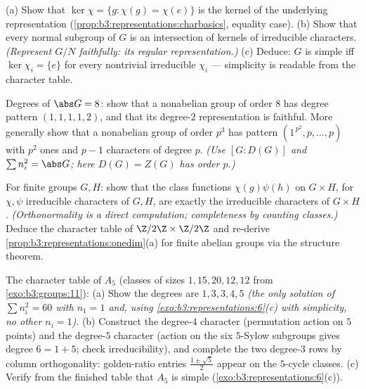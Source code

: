 \begin{exercise}[$\star\star$]\label{exo:b3:representations:6}
(a) Show that $\ker\chi = \{g : \chi(g) = \chi(e)\}$ is the
kernel of the underlying representation
(\cref{prop:b3:representations:charbasics}, equality case).
(b) Show that every normal subgroup of $G$ is an intersection of
kernels of irreducible characters. \emph{(Represent $G/N$
faithfully: its regular representation.)}
(c) Deduce: $G$ is simple iff $\ker\chi_i = \{e\}$ for every
nontrivial irreducible $\chi_i$ --- simplicity is readable from
the character table.
\end{exercise}

\begin{exercise}[$\star\star$]\label{exo:b3:representations:7}
Degrees of $\abs G = 8$: show that a nonabelian group of order
$8$ has degree pattern $(1,1,1,1,2)$, and that its degree-$2$
representation is faithful. More generally show that a
nonabelian group of order $p^3$ has pattern $(1^{\,p^2},
p, \dots, p)$ with $p^2$ ones and $p - 1$ characters of degree
$p$. \emph{(Use $[G : D(G)]$ and $\sum n_i^2 = \abs G$; here
$D(G) = Z(G)$ has order $p$.)}
\end{exercise}

\begin{exercise}[$\star\star\star$]\label{exo:b3:representations:8}
For finite groups $G, H$: show that the class functions
$\chi(g)\psi(h)$ on $G \times H$, for $\chi, \psi$ irreducible
characters of $G, H$, are exactly the irreducible characters of
$G \times H$. \emph{(Orthonormality is a direct computation;
completeness by counting classes.)} Deduce the character table
of $\Z/2\Z \times \Z/2\Z$ and re-derive
\cref{prop:b3:representations:onedim}(a) for finite abelian
groups via the structure theorem.
\end{exercise}

\begin{exercise}[$\star\star\star$]\label{exo:b3:representations:9}
The character table of $A_5$ (classes of sizes $1, 15, 20, 12,
12$ from \cref{exo:b3:groups:11}):
(a) Show the degrees are $1, 3, 3, 4, 5$ \emph{(the only
solution of $\sum n_i^2 = 60$ with $n_1 = 1$ and, using
\cref{exo:b3:representations:6}(c) with simplicity, no other
$n_i = 1$)}.
(b) Construct the degree-$4$ character (permutation action on
$5$ points) and the degree-$5$ character (action on the six
$5$-Sylow subgroups gives degree $6 = 1 + 5$; check
irreducibility), and complete the two degree-$3$ rows by column
orthogonality: golden-ratio entries $\frac{1\pm\sqrt5}2$ appear
on the $5$-cycle classes.
(c) Verify from the finished table that $A_5$ is simple
(\cref{exo:b3:representations:6}(c)).
\end{exercise}

